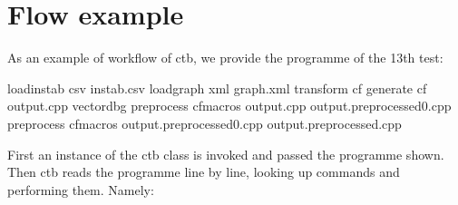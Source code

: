 
\section{Flow example}

As an example of workflow of ctb, we provide the programme of the 13th test:

\mybeginfig
\begin{code}
loadinstab csv instab.csv
loadgraph xml graph.xml
transform cf
generate cf output.cpp vectordbg
preprocess cfmacros output.cpp output.preprocessed0.cpp
preprocess cfmacros output.preprocessed0.cpp output.preprocessed.cpp
\end{code}

First an instance of the ctb class is invoked and passed the programme shown. Then ctb reads the programme line by line, looking up commands and performing them. Namely:
